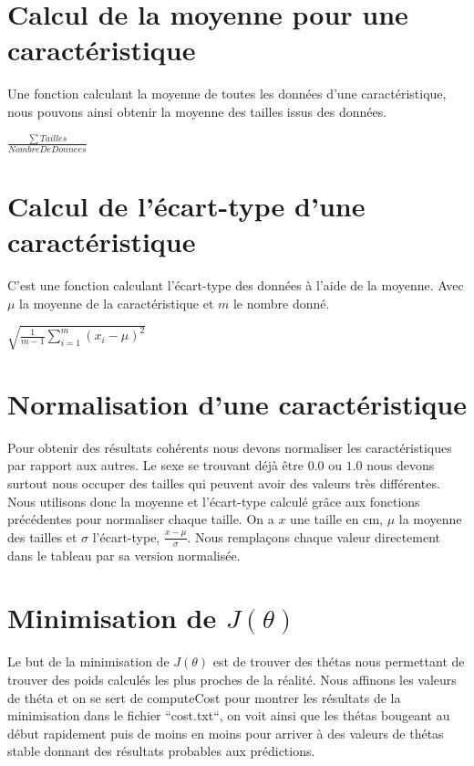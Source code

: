 \documentclass{article}
\begin{document}
\section{Calcul de la moyenne pour une caractéristique}
Une fonction calculant la moyenne de toutes les données d'une caractéristique, nous pouvons ainsi obtenir la moyenne des tailles issus des données.
\begin{center}
$\frac{\sum Tailles}{Nombre De Donnees}$
\end{center}

\section{Calcul de l'écart-type d'une caractéristique}
C'est une fonction calculant l'écart-type des données à l'aide de la moyenne. 
Avec $\mu$ la moyenne de la caractéristique et $m$ le nombre donné.
\begin{center}
$\sqrt{\frac{1}{m - 1}\sum_{i=1}^{m}(x_{i} - \mu)^{2}}$
\end{center}

\section{Normalisation d'une caractéristique}
Pour obtenir des résultats cohérents nous devons normaliser les caractéristiques par rapport aux autres. Le sexe se trouvant déjà être $0.0$ ou $1.0$ nous devons surtout nous occuper des tailles qui peuvent avoir des valeurs très différentes. Nous utilisons donc la moyenne et l'écart-type calculé grâce aux fonctions précédentes pour normaliser chaque taille.
On a $x$ une taille en cm, $\mu$ la moyenne des tailles et $\sigma$ l'écart-type, $\frac{x - \mu}{\sigma}$.
Nous remplaçons chaque valeur directement dans le tableau par sa version normalisée.

\section{Minimisation de $J(\theta)$}
Le but de la minimisation de $J(\theta)$ est de trouver des thétas nous permettant de trouver des poids calculés les plus proches de la réalité.
Nous affinons les valeurs de théta et on se sert de computeCost pour montrer les résultats de la minimisation dans le fichier ``cost.txt``, on voit ainsi que les thétas bougeant au début rapidement puis de moins en moins pour arriver à des valeurs de thétas stable donnant des résultats probables aux prédictions.
\end{document}

